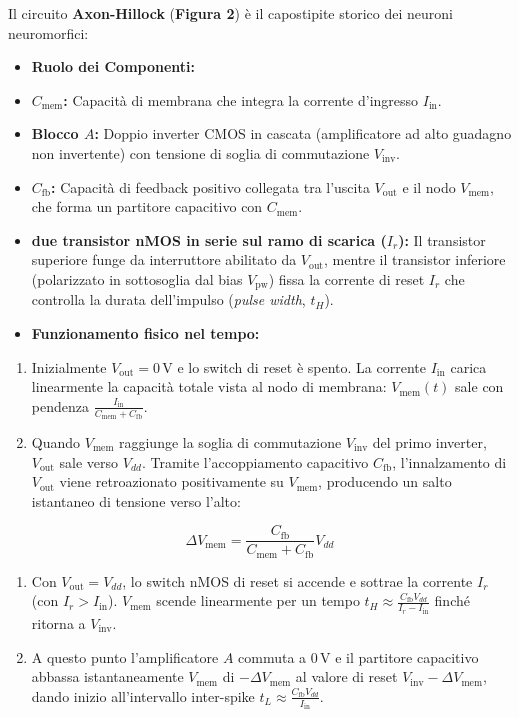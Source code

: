 \documentclass[11pt,a4paper]{article}
\begin{document}
Il circuito \textbf{Axon-Hillock} (\textbf{Figura 2}) è il capostipite storico dei neuroni neuromorfici:
\begin{itemize}
  \item \textbf{Ruolo dei Componenti:}
  \item \textbf{$C_{\text{mem}}$:} Capacità di membrana che integra la corrente d'ingresso $I_{\text{in}}$.
  \item \textbf{Blocco $A$:} Doppio inverter CMOS in cascata (amplificatore ad alto guadagno non invertente) con tensione di soglia di commutazione $V_{\text{inv}}$.
  \item \textbf{$C_{\text{fb}}$:} Capacità di feedback positivo collegata tra l'uscita $V_{\text{out}}$ e il nodo $V_{\text{mem}}$, che forma un partitore capacitivo con $C_{\text{mem}}$.
  \item \textbf{ due transistor nMOS in serie sul ramo di scarica ($I_r$):} Il transistor superiore funge da interruttore abilitato da $V_{\text{out}}$, mentre il transistor inferiore (polarizzato in sottosoglia dal bias \textbf{$V_{\text{pw}}$}) fissa la corrente di reset $I_r$ che controlla la durata dell'impulso (\textit{pulse width}, $t_H$).
  \item \textbf{Funzionamento fisico nel tempo:}
\end{itemize}
\begin{enumerate}
  \item Inizialmente $V_{\text{out}} = 0\,\text{V}$ e lo switch di reset è spento. La corrente $I_{\text{in}}$ carica linearmente la capacità totale vista al nodo di membrana: $V_{\text{mem}}(t)$ sale con pendenza $\frac{I_{\text{in}}}{C_{\text{mem}} + C_{\text{fb}}}$.
  \item Quando $V_{\text{mem}}$ raggiunge la soglia di commutazione $V_{\text{inv}}$ del primo inverter, $V_{\text{out}}$ sale verso $V_{dd}$. Tramite l'accoppiamento capacitivo $C_{\text{fb}}$, l'innalzamento di $V_{\text{out}}$ viene retroazionato positivamente su $V_{\text{mem}}$, producendo un salto istantaneo di tensione verso l'alto:
\end{enumerate}
\[
\Delta V_{\text{mem}} = \frac{C_{\text{fb}}}{C_{\text{mem}} + C_{\text{fb}}} V_{dd}
\]
\begin{enumerate}
  \item Con $V_{\text{out}} = V_{dd}$, lo switch nMOS di reset si accende e sottrae la corrente $I_r$ (con $I_r > I_{\text{in}}$). $V_{\text{mem}}$ scende linearmente per un tempo $t_H \approx \frac{C_{\text{fb}} V_{dd}}{I_r - I_{\text{in}}}$ finché ritorna a $V_{\text{inv}}$.
  \item A questo punto l'amplificatore $A$ commuta a $0\,\text{V}$ e il partitore capacitivo abbassa istantaneamente $V_{\text{mem}}$ di $-\Delta V_{\text{mem}}$ al valore di reset $V_{\text{inv}} - \Delta V_{\text{mem}}$, dando inizio all'intervallo inter-spike $t_L \approx \frac{C_{\text{fb}} V_{dd}}{I_{\text{in}}}$.
\end{enumerate}
\end{document}
